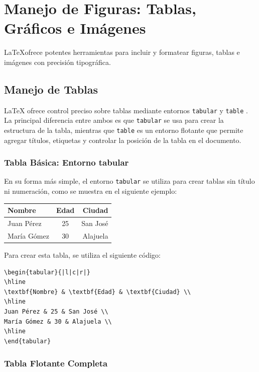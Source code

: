 \section{Manejo de Figuras: Tablas, Gráficos e Imágenes}
\LaTeX ofrece potentes herramientas para incluir y formatear figuras, tablas e imágenes con precisión tipográfica. 

\subsection{Manejo de Tablas}
\LaTeX{} ofrece control preciso sobre tablas mediante entornos \texttt{tabular} y \texttt{table} \cite{latex_project}. La principal diferencia entre ambos es que \texttt{tabular} se usa para crear la estructura de la tabla, mientras que \texttt{table} es un entorno flotante que permite agregar títulos, etiquetas y controlar la posición de la tabla en el documento.

\subsubsection{Tabla Básica: Entorno tabular}

En su forma más simple, el entorno \texttt{tabular} se utiliza para crear tablas sin título ni numeración, como se muestra en el siguiente ejemplo:

\begin{tabular}{|l|c|r|}   
\hline 
\textbf{Nombre} & \textbf{Edad} & \textbf{Ciudad} \\
\hline
Juan Pérez & 25 & San José \\
María Gómez & 30 & Alajuela \\
\hline
\end{tabular}

Para crear esta tabla, se utiliza el siguiente código:

\begin{verbatim}
\begin{tabular}{|l|c|r|}
\hline
\textbf{Nombre} & \textbf{Edad} & \textbf{Ciudad} \\
\hline
Juan Pérez & 25 & San José \\
María Gómez & 30 & Alajuela \\
\hline
\end{tabular}
\end{verbatim}

\subsubsection{Tabla Flotante Completa}

